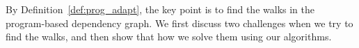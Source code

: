 By Definition~\ref{def:prog_adapt}, the key point is to find the walks in the program-based dependency graph. 
We first discuss two challenges when we try to find the walks,
and then show that how we solve them using our algorithms.

